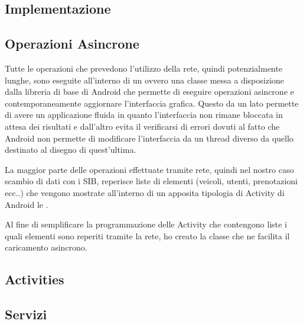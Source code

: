 \subsection{Implementazione}

\subsection{Operazioni Asincrone}

Tutte le operazioni che prevedono l'utilizzo della rete, quindi potenzialmente lunghe, sono eseguite all'interno di un  ovvero una classe messa a disposizione dalla libreria di base di Android che permette di eseguire operazioni asincrone e contemporaneamente aggiornare l'interfaccia grafica. Questo da un lato permette di avere un applicazione fluida in quanto l'interfaccia non rimane bloccata in attesa dei risultati e dall'altro evita il verificarsi di errori dovuti al fatto che Android non permette di modificare l'interfaccia da un thread diverso da quello destinato al disegno di quest'ultima.

La maggior parte delle operazioni effettuate tramite rete, quindi nel nostro caso scambio di dati con i SIB, reperisce liste di elementi (veicoli, utenti, prenotazioni ecc..) che vengono mostrate all'interno di un apposita tipologia di Activity di Android le .

Al fine di semplificare la programmazione delle Activity che contengono liste i quali elementi sono reperiti tramite la rete, ho creato la classe  che ne facilita il caricamento asincrono.

\subsection{Activities}

\subsection{Servizi}